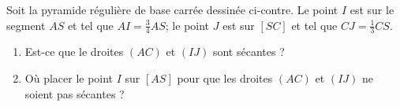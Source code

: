 
\begin{exercice}\label{exosmath-0081}

    \begin{multicols}{2}
        Soit la pyramide régulière de base carrée dessinée ci-contre. Le point \( I\) est sur le segment \( AS\) et tel que \( AI=\frac{ 3 }{ 4 }AS\); le point \( J\) est sur \( [SC]\) et tel que \( CJ=\frac{1}{ 3 }CS\).

        \begin{enumerate}
            \item
        Est-ce que le droites \( (AC)\) et \( (IJ)\) sont sécantes ?
    \item
        Où placer le point \( I\) sur \( [AS]\) pour que les droites \( (AC)\) et \( (IJ)\) ne soient pas sécantes ?
        \end{enumerate}

        \columnbreak

        \begin{center}

        \end{center}

    \end{multicols}

\end{exercice}
